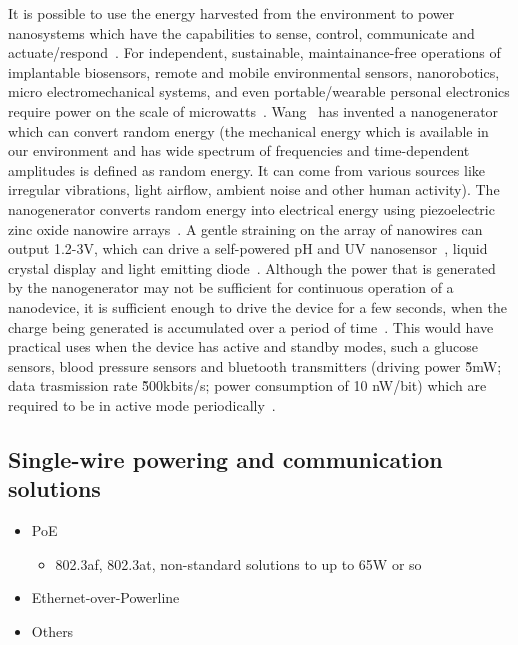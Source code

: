 \documentclass[draft,a4paper]{siamltex}
\begin{document}
It is possible to use the energy harvested from the environment to power
nanosystems which have the capabilities to sense, control, communicate and
actuate/respond~\cite{wang2010toward}. For independent, sustainable,
maintainance-free operations of implantable biosensors, remote and mobile
environmental sensors, nanorobotics, micro electromechanical systems, and even
portable/wearable personal electronics require power on the scale of
microwatts~\cite{wang2010toward}. Wang~\cite{wang2010toward} has invented a
nanogenerator which can convert random energy (the mechanical energy which is
available in our environment and has wide spectrum of frequencies and
time-dependent amplitudes is defined as random energy. It can come from various
sources like irregular vibrations, light airflow, ambient noise and other human
activity). The nanogenerator converts random energy into electrical energy using
piezoelectric zinc oxide nanowire
arrays~\cite{wang2006piezoelectric}\cite{yang2009converting}. A gentle straining
on the array of nanowires can output 1.2-3V, which can drive a self-powered pH
and UV nanosensor~\cite{xu2010self}, liquid crystal display and light emitting
diode~\cite{xu2010piezoelectric}\cite{zhu2010flexible}. Although the power that
is generated by the nanogenerator may not be sufficient for continuous operation
of a nanodevice, it is sufficient enough to drive the device for a few seconds,
when the charge being generated is accumulated over a period of
time~\cite{wang2010toward}. This would have practical uses when the device has
active and standby modes, such a glucose sensors, blood pressure sensors and
bluetooth transmitters (driving power \~5mW; data trasmission rate \~500kbits/s;
power consumption of 10 nW/bit) which are required to be in active mode
periodically~\cite{wang2010toward}.

\subsection{Single-wire powering and communication solutions}

\begin{itemize}
  \item PoE
    \begin{itemize}
    \item 802.3af, 802.3at, non-standard solutions to up to 65W or so
    \end{itemize}
  \item Ethernet-over-Powerline
  \item Others
\end{itemize}
 
\end{document}
